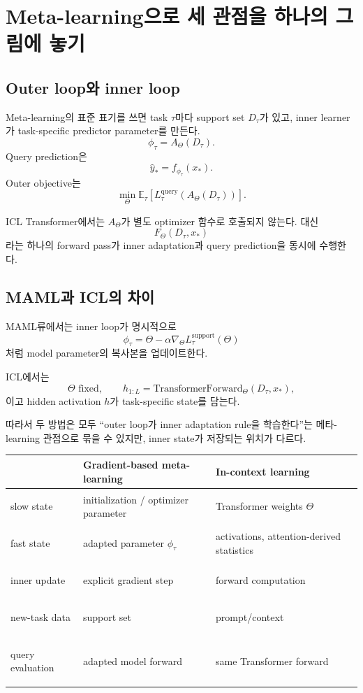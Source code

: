 \documentclass[11pt,a4paper,oneside,openany]{memoir}
\newcommand{\E}{\mathbb{E}}
\theoremstyle{definition}
\begin{document}
\chapter{Meta-learning으로 세 관점을 하나의 그림에 놓기}

\section{Outer loop와 inner loop}

Meta-learning의 표준 표기를 쓰면 task $\tau$마다 support set $D_\tau$가 있고,
inner learner가 task-specific predictor parameter를 만든다.
\[
\phi_\tau=A_\Theta(D_\tau).
\]
Query prediction은
\[
\hat y_*=f_{\phi_\tau}(x_*).
\]
Outer objective는
\[
\min_\Theta
\E_{\tau}
\left[
L_\tau^{\mathrm{query}}(A_\Theta(D_\tau))
\right].
\]

ICL Transformer에서는 $A_\Theta$가 별도 optimizer 함수로 호출되지 않는다.
대신
\[
\boxed{
F_\Theta(D_\tau,x_*)
}
\]
라는 하나의 forward pass가 inner adaptation과 query prediction을 동시에 수행한다.

\section{MAML과 ICL의 차이}

MAML류에서는 inner loop가 명시적으로
\[
\phi_\tau
=\Theta-\alpha\nabla_\Theta L_\tau^{\mathrm{support}}(\Theta)
\]
처럼 model parameter의 복사본을 업데이트한다.

ICL에서는
\[
\Theta\text{ fixed},
\qquad
h_{1:L}=\text{TransformerForward}_\Theta(D_\tau,x_*),
\]
이고 hidden activation $h$가 task-specific state를 담는다.

따라서 두 방법은 모두 ``outer loop가 inner adaptation rule을 학습한다''는 메타-learning 관점으로 묶을 수 있지만,
inner state가 저장되는 위치가 다르다.

\begin{center}
\small
\begin{tabularx}{\textwidth}{>{\bfseries\raggedright\arraybackslash}p{}Y Y}
\toprule
 & Gradient-based meta-learning & In-context learning \\
\midrule
slow state & initialization / optimizer parameter & Transformer weights $\Theta$ \\
fast state & adapted parameter $\phi_\tau$ & activations, attention-derived statistics \\
inner update & explicit gradient step & forward computation \\
new-task data & support set & prompt/context \\
query evaluation & adapted model forward & same Transformer forward \\
\bottomrule
\end{tabularx}
\end{center}
\end{document}
